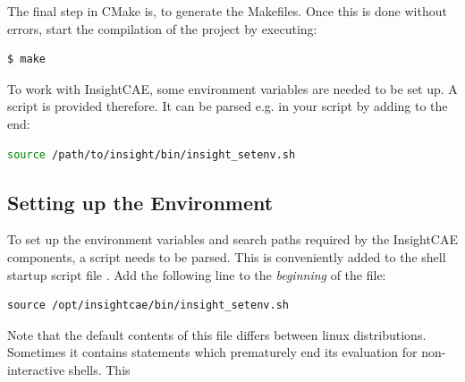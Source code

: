 The final step in CMake is, to generate the Makefiles. Once this is done without errors, start the compilation of the project by executing:

\begin{lstlisting}[language=bash]
$ make
\end{lstlisting}

To work with InsightCAE, some environment variables are needed to be set up. A script is provided therefore. It can be parsed e.g. in your  script by adding to the end:

\begin{lstlisting}[language=bash]
source /path/to/insight/bin/insight_setenv.sh
\end{lstlisting}



\subsection{Setting up the Environment}
\label{sec:setupenvironment}

To set up the environment variables and search paths required by the InsightCAE components, a script needs to be parsed.
This is conveniently added to the shell startup script file .
Add the following line to the \emph{beginning} of the  file:

\begin{lstlisting}
source /opt/insightcae/bin/insight_setenv.sh
\end{lstlisting}

Note that the default contents of this file differs between linux distributions.
Sometimes it contains statements which prematurely end its evaluation for non-interactive shells.
This